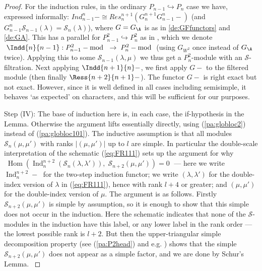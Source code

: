 \documentclass[reqno,10pt,a4paper]{amsart}
\DeclareMathOperator{\Hom}{Hom}
\DeclareMathOperator{\Ind}{Ind}
\newcommand{\blue}[1]{\textcolor{blue}{#1}}
\newcommand{\ppmx}[1]{}
\newcommand{\ppmm}[1]{{#1}}
\newcommand{\ca}[1]{\blue{#1}}
\newcommand{\cell}{\mathcal{S}}
\newcommand{\SSS}{\mathcal{S}} %
\begin{document}
\begin{proof}
{\ppmm{For the induction rules, in the ordinary 
$P_{n-1} \hookrightarrow P_n$ 
case we have,
expressed informally:
$ Ind_{n-1}^{n} - \cong Res^{n+1}_{n}(G_{n}^{n+1} G_{n-1}^{n} -)$ 
(and $G_{n-1}^{n} \SSS_{n-1}(\lambda) = \SSS_n(\lambda)$),
where $G = G_\A$ is as in \ref{de:GFfunctors} and \ref{de:GA}. 
This has a parallel for 
$P^2_{n-1} \hookrightarrow P^2_{n}$ 
as in 
\cite[(11.7)]{amm2019tonal},
which we denote 
$\; \Indd{n}{n-1} : P^2_{n-1}-\!\!\!\!\mod \;\rightarrow\; P^2_{n}-\!\!\!\!\mod$
(using $G_{W^2}$ once instead of $G_\A$ twice). }
Applying this to some $\SSS_{n-1}(\lambda,\mu)$ we thus get a $P^2_n$-module with an $\SSS$-filtration. 
Next applying $\Indd{n+1}{n}-$, we first apply $G-$ to the filtered module (then finally $\Ress{n+2}{n+1} -$). The functor $G-$ is right exact but not exact. 
However,
since it is well defined in all cases including semisimple, 
it behaves `as expected' on characters, %
and this will be sufficient for our purposes. %
\ppmx{ 
[So it remains to derive the 
corresponding property in our double-step case.]
[DONE now?]}%

\medskip 

\noindent 
Step (IV):
The base of induction here is,
in each case,
the if-hypothesis in the Lemma. %
Otherwise the argument lifts essentially directly, using (\ref{pa:globloc2}) instead of (\ref{pa:globloc101}).
\ppmm{
The inductive assumption is that all modules $\SSS_n(\mu,\mu')$ with ranks $|(\mu,\mu')|$ up to $l$ are simple. 
In particular the double-scale interpretation of the schematic 
(\ref{eq:FR111}) 
sets up the argument for why 
$\; \Hom(\Ind_n^{n+2}(\SSS_{n} (\lambda,\lambda')) , 
\; \SSS_{n+2}(\mu,\mu')) = 0 \;$
--- here we write $\Ind_{n}^{n+2} \!-\; $ 
for the two-step induction functor;
we write 
$(\lambda,\lambda')$ for the double-index version of $\lambda$ in (\ref{eq:FR111}), hence with rank $l+4$ or greater; 
and $(\mu,\mu')$ for the double-index version of $\mu$. 
The argument is as follows. 
Firstly   $ \SSS_{n+2}(\mu,\mu') $ is simple by assumption,
so it is enough to show that this simple does not occur in the induction. Here the schematic indicates that none of the $\SSS$-modules in the induction have this label, or any lower label in the rank order
--- the lowest possible rank is $l+2$. 
But then the upper-triangular simple decomposition property 
(see (\ref{pa:P2head}) and e.g. \cite[9.4]{amm2019tonal}) 
shows that the simple  $ \SSS_{n+2}(\mu,\mu') $ does not appear
as a simple factor,
and we are done by Schur's Lemma. }

}
\end{proof}
\end{document}
